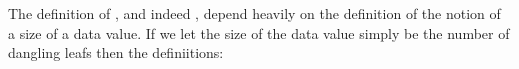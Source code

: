 The definition of ,  and indeed , depend heavily
on the definition of the notion of a size of a data value. If we let the size
of the data value simply be the number of dangling leafs then the definiitions: 











